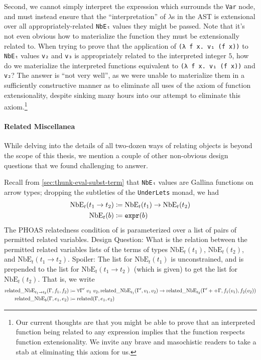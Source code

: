 Second, we cannot simply interpret the expression which surrounds the \texttt{Var} node, and must instead ensure that the ``interpretation'' of $\lambda$s in the AST is extensional over all appropriately-related \texttt{NbEₜ} values they might be passed.
Note that it's not even obvious how to materialize the function they must be extensionally related to.
When trying to prove that the application of \texttt{(λ f x. v₁ (f x))} to \texttt{NbEₜ} values \texttt{v₂} and \texttt{v₃} is appropriately related to the interpreted integer $5$, how do we materialize the interpreted functions equivalent to \texttt{(λ f x. v₁ (f x))} and \texttt{v₂}?
The answer is ``not very well'', as we were unable to materialize them in a sufficiently constructive manner as to eliminate all uses of the axiom of function extensionality, despite sinking many hours into our attempt to eliminate this axiom.\footnote{%
  Our current thoughts are that you might be able to prove that an interpreted function being related to any expression implies that the function respects function extensionality.
  We invite any brave and masochistic readers to take a stab at eliminating this axiom for us.%
}

\paragraph{Related Miscellanea}
While delving into the details of all two-dozen ways of relating objects is beyond the scope of this thesis, we mention a couple of other non-obvious design questions that we found challenging to answer.

Recall from \autoref{sec:thunk-eval-subst-term} that \texttt{NbEₜ} values are Gallina functions on arrow types; dropping the subtleties of the \texttt{UnderLets} monad, we had
\begin{align*}
  \text{NbE}_t(t_1 \to t_2) & \coloneqq \text{NbE}_t(t_1) \to \text{NbE}_t(t_2) \\
  \text{NbE}_t(b) & \coloneqq \texttt{expr}(b)
\end{align*}
The PHOAS relatedness condition of  is parameterized over a list of pairs of permitted related variables.
Design Question: What is the relation between the permitted related variables lists of the terms of types $\text{NbE}_t(t_1)$, $\text{NbE}_t(t_2)$, and $\text{NbE}_t(t_1 \to t_2)$.
Spoiler: The list for $\text{NbE}_t(t_1)$ is unconstrained, and is prepended to the list for $\text{NbE}_t(t_1 \to t_2)$ (which is given) to get the list for $\text{NbE}_t(t_2)$.
That is, we write
\begin{align*}
  \text{related\_NbE}_{t_1 \to t_2}(\Gamma, f_1, f_2) & \coloneqq \forall \Gamma'\ v_1\ v_2, \text{related\_NbE}_{t_1}(\Gamma', v_1, v_2) \to \text{related\_NbE}_{t_2}(\Gamma' ++ \Gamma, f_1(v_1), f_2(v_2)) \\
  \text{related\_NbE}_b(\Gamma, e_1, e_2) & \coloneqq \text{related}(\Gamma, e_1, e_2)
\end{align*}


